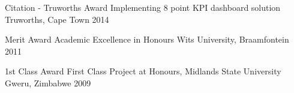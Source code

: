 




\begin{cvhonors}

\cvhonor
{Citation - Truworths Award} %
{Implementing 8 point KPI dashboard solution} %
{Truworths, Cape Town} %
{2014} %


\cvhonor
{Merit Award} %
{Academic Excellence in Honours} %
{Wits University, Braamfontein} %
{2011} %


\cvhonor
{1st Class Award} %
{ First Class Project at Honours, Midlands State University} %
{Gweru, Zimbabwe} %
{2009} %



\end{cvhonors}

